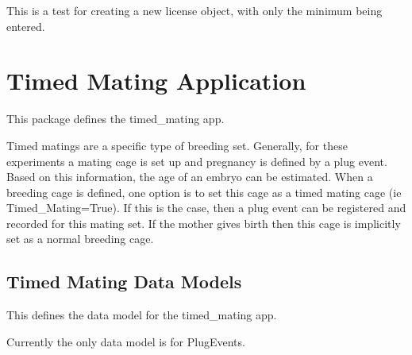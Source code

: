 \documentclass[letterpaper,10pt,english]{sphinxmanual}
\begin{document}
\begin{fulllineitems}
\begin{fulllineitems}
\end{fulllineitems}


\begin{fulllineitems}
\label{groups:mousedb.groups.tests.GroupsModelTests.test_create_license_minimal}
This is a test for creating a new license object, with only the minimum being entered.

\end{fulllineitems}


\end{fulllineitems}



\section{Timed Mating Application}
\label{timed_mating:timed-mating-application}\label{timed_mating::doc}\label{timed_mating:module-mousedb.timed_mating}
This package defines the timed\_mating app.

Timed matings are a specific type of breeding set.  
Generally, for these experiments a mating cage is set up and pregnancy is defined by a plug event.  
Based on this information, the age of an embryo can be estimated.  
When a breeding cage is defined, one option is to set this cage as a timed mating cage (ie Timed\_Mating=True).  
If this is the case, then a plug event can be registered and recorded for this mating set.  
If the mother gives birth then this cage is implicitly set as a normal breeding cage.


\subsection{Timed Mating Data Models}
\label{timed_mating:module-mousedb.timed_mating.models}\label{timed_mating:timed-mating-data-models}
This defines the data model for the timed\_mating app.

Currently the only data model is for PlugEvents.
\end{document}
